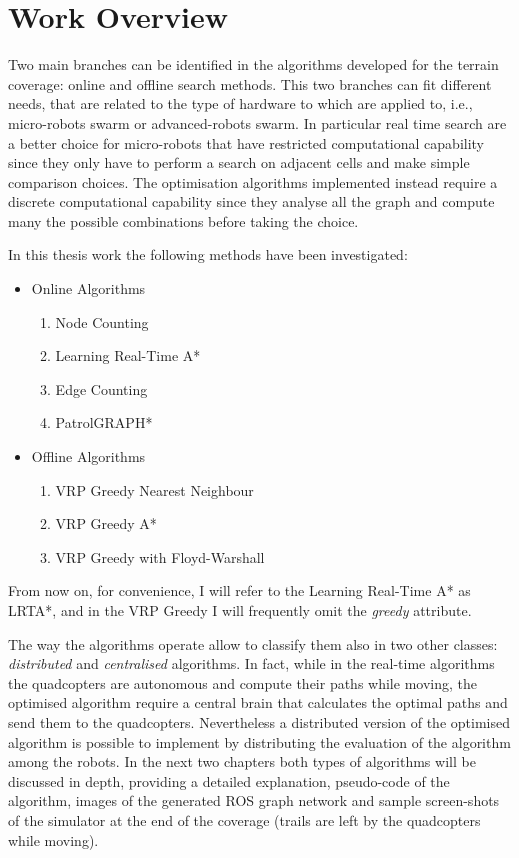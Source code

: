 \chapter{Work Overview}

Two main branches can be identified in the algorithms developed for the terrain coverage: online and offline search methods. This two branches can fit different needs, that are related to the type of hardware to which are applied to, i.e., micro-robots swarm or advanced-robots swarm. In particular real time search are a better choice for micro-robots that have restricted computational capability since they only have to perform a search on adjacent cells and make simple comparison choices. The optimisation algorithms implemented instead require a discrete computational capability since they analyse all the graph and compute many the possible combinations before taking the choice.

\noindent In this thesis work the following methods have been investigated:

\begin{itemize}
\item Online Algorithms
	\begin{enumerate}
	\item Node Counting	
	\item Learning Real-Time A*
	\item Edge Counting
	\item PatrolGRAPH*
	\end{enumerate}

\item Offline Algorithms
	\begin{enumerate}
	\item VRP Greedy Nearest Neighbour
	\item VRP Greedy A*
	\item VRP Greedy with Floyd-Warshall
	\end{enumerate}
\end{itemize}
From now on, for convenience, I will refer to the Learning Real-Time A* as LRTA*, and in the VRP Greedy I will frequently omit the \emph{greedy} attribute.

The way the algorithms operate allow to classify them also in two other classes: \emph{distributed} and \emph{centralised} algorithms. In fact, while in the real-time algorithms the quadcopters are autonomous and compute their paths while moving, the optimised algorithm require a central brain that calculates the optimal paths and send them to the quadcopters. Nevertheless a distributed version of the optimised algorithm is possible to implement by distributing the evaluation of the algorithm among the robots.
In the next two chapters both types of algorithms will be discussed in depth, providing a detailed explanation, pseudo-code of the algorithm, images of the generated ROS graph network and sample screen-shots of the simulator at the end of the coverage (trails are left by the quadcopters while moving).

